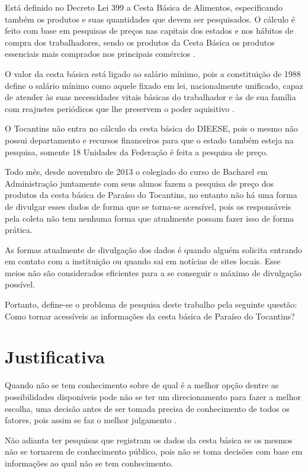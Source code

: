 \documentclass{ifto-tex}
\begin{document}
		Está definido no Decreto Lei 399 a Cesta Básica de Alimentos, especificando também os produtos e suas quantidades que devem ser pesquisados. O cálculo é feito com base em pesquisas de preços nas capitais dos estados e nos hábitos de compra dos trabalhadores, sendo os produtos da Cesta Básica os produtos essenciais mais comprados nos principais comércios \cite{metodolo8:online}.
		
		O valor da cesta básica está ligado ao salário mínimo, pois a constituição de 1988 define o salário mínimo como aquele fixado em lei, nacionalmente unificado, capaz de atender às suas necessidades vitais básicas do trabalhador e às de sua família com reajustes periódicos que lhe preservem o poder aquisitivo \cite{metodolo8:online}.
		
		O Tocantins não entra no cálculo da cesta básica do DIEESE, pois o mesmo não possui departamento e recursos financeiros para que o estado também esteja na pesquisa, somente 18 Unidades da Federação é feita a pesquisa de preço.
		
		Todo mês, desde novembro de 2013 o colegiado do curso de Bacharel em Administração juntamente com seus alunos fazem a pesquisa de preço dos produtos da cesta básica de Paraíso do Tocantins, no entanto não há uma forma de divulgar esses dados de forma que se torna-se acessível, pois os responsáveis pela coleta não tem nenhuma forma que atualmente possam fazer isso de forma prática.
		
		As formas atualmente de divulgação dos dados é quando alguém solicita entrando em contato com a instituição ou quando sai em notícias de sites locais. Esse meios não são considerados eficientes para a se conseguir o máximo de divulgação possível.
		
		Portanto, define-se o problema de pesquisa deste trabalho pela seguinte questão: Como tornar acessíveis as informações da cesta básica de Paraíso do Tocantins?
		
	
\chapter{Justificativa}
	
		Quando não se tem conhecimento sobre de qual é a melhor opção dentre as possibilidades disponíveis pode não se ter um direcionamento para fazer a melhor escolha, uma decisão antes de ser tomada precisa de conhecimento de todos os fatores, pois assim se faz o melhor julgamento \cite{bezerra2013efeito}.
		
		Não adianta ter pesquisas que registram os dados da cesta básica se os mesmos não se tornarem de conhecimento público, pois não se toma decisões com base em informações ao qual não se tem conhecimento.
		
\end{document}
